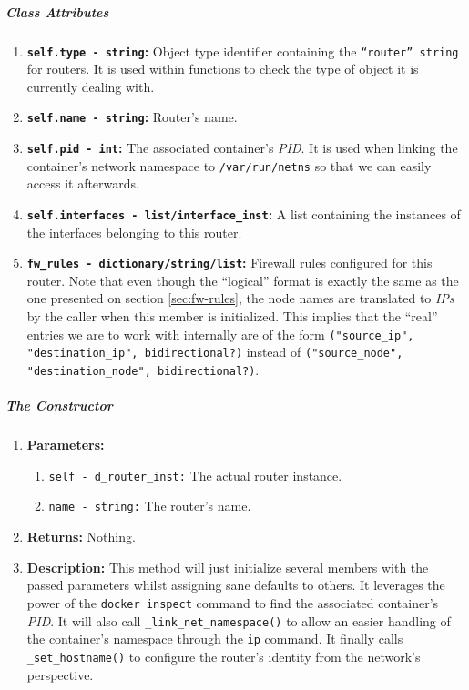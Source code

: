         \subparagraph{Class Attributes}
            \begin{enumerate}
                \item \textbf{\texttt{self.type - string}:} Object type identifier containing the \texttt{``router'' string} for routers. It is used within functions to check the type of object it is currently dealing with.
                \item \textbf{\texttt{self.name - string}:} Router's name.
                \item \textbf{\texttt{self.pid - int}:} The associated container's \textit{PID}. It is used when linking the container's network namespace to \texttt{/var/run/netns} so that we can easily access it afterwards.
                \item \textbf{\texttt{self.interfaces - list/interface\_inst}:}  A list containing the instances of the interfaces belonging to this router.
                \item \textbf{\texttt{fw\_rules - dictionary/string/list}:} Firewall rules configured for this router. Note that even though the ``logical'' format is exactly the same as the one presented on section \ref{sec:fw-rules}, the node names are translated to \textit{IPs} by the caller when this member is initialized. This implies that the ``real'' entries we are to work with internally are of the form \texttt{("source\_ip", "destination\_ip", bidirectional?)} instead of \texttt{("source\_node", "destination\_node", bidirectional?)}.
            \end{enumerate}

        \subparagraph{The Constructor}
            \begin{enumerate}
                \item \textbf{Parameters:}
                \begin{enumerate}
                    \item \texttt{self - d\_router\_inst:} The actual router instance.
                    \item \texttt{name - string:} The router's name.
                \end{enumerate}
                \item \textbf{Returns:} Nothing.
                \item \textbf{Description:} This method will just initialize several members with the passed parameters whilst assigning sane defaults to others. It leverages the power of the \texttt{docker inspect} command to find the associated container's \textit{PID}. It will also call \texttt{\_link\_net\_namespace()} to allow an easier handling of the container's namespace through the \texttt{ip} command. It finally calls \texttt{\_set\_hostname()} to configure the router's identity from the network's perspective.
            \end{enumerate}

